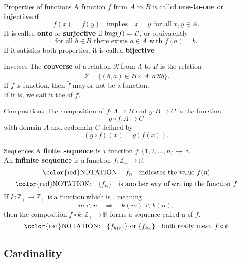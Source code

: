 \documentclass{beamer}
\begin{document}
\begin{frame}{Properties of functions}
A function $f$ from $A$ to $B$ is called \textbf{one-to-one} or \textbf{injective} if 
\pause
$$f(x) = f(y) \quad\text{implies}\quad x=y\ \ \text{for all $x,y\in A$}.$$
\pause
It is called \textbf{onto} or \textbf{surjective} if $\textnormal{img}(f) = B$, or equivalently
$$\text{for all $b\in B$ there exists $a\in A$ with $f(a) =b$}.$$
\pause
If it satisfies both properties, it is called \textbf{bijective}.
\end{frame}

\begin{frame}{Inverses}
The \textbf{converse} of a relation $\mathcal R$ from $A$ to $B$ is the relation
\pause
$$\check{\mathcal R} = \{(b,a)\in B\times A: a\mathcal R b\}.$$
\pause
If $f$ is  function, then $\check f$ may or not be a function.\\
\pause
If it is, we call it the  of $f$.
\end{frame}

\begin{frame}{Compositions}
The composition of $f: A\rightarrow B$ and $g: B\rightarrow C$ is the function
\pause
$$g\circ f: A\rightarrow C$$
\pause
with domain $A$ and codomain $C$ defined by
\pause
$$(g\circ f)(x)  = g(f(x)).$$
\end{frame}

\begin{frame}{Sequences}
A \textbf{finite sequence} is a function $f: \{1,2,\dots,n\}\rightarrow \mathbb{R}$.\\
\pause
An \textbf{infinite sequence} is a function $f: \mathbb{Z}_+\rightarrow \mathbb{R}$.\\
\pause
$$\text{\color{red}NOTATION:}\quad f_n\quad\text{indicates the value}\ f(n)$$
\pause
$$\text{\color{red}NOTATION:}\quad \{f_n\}\quad\text{is another way of writing the function}\ f$$
\pause
If $k:\mathbb{Z}_+\rightarrow\mathbb{Z}_+$ is a function which is , meaning
$$m < n\quad\Rightarrow\quad k(m) < k(n),$$
\pause
then the composition $f\circ k: \mathbb{Z}_+\rightarrow \mathbb{R}$ forms a sequence called a  of $f$.
\pause
$$\text{\color{red}NOTATION:}\quad \{f_{k(n)}\}\ \text{or}\ \{f_{k_n}\}\quad\text{both really mean}\ f\circ k$$
\end{frame}

\subsection{Cardinality}
\end{document}

